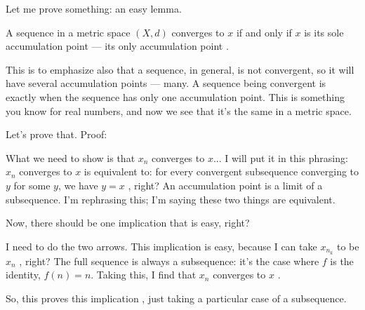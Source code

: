 \begin{speech}[00:29:05 - 00:30:50]
Let me prove something: an easy lemma.

A sequence in a metric space $(X, d)$  converges to $x$  if and only if  $x$ is its sole accumulation point --- its only accumulation point . 

This is to emphasize also that a sequence, in general, is not convergent, so it will have several accumulation points --- many. A sequence being convergent is exactly when the sequence has only one accumulation point. This is something you know for real numbers, and now we see that it's the same in a metric space.

Let's prove that. Proof: 
\end{speech}

\begin{content}
\end{content}

\begin{speech}[00:30:50 - 00:32:51]
What we need to show is that $x_n$ converges to $x$...  I will put it in this phrasing: $x_n$ converges to $x$ is equivalent to: for every convergent subsequence converging to $y$ for some $y$, we have $y = x$ , right? An accumulation point is a limit of a subsequence. I'm rephrasing this; I'm saying these two things are equivalent.

Now, there should be one implication that is easy, right? 

I need to do the two arrows. This implication is easy, because I can take $x_{n_k}$ to be $x_n$ , right? The full sequence is always a subsequence: it's the case where $f$ is the identity, $f(n) = n$. Taking this, I find that $x_n$ converges to $x$ .

So, this proves this implication , just taking a particular case of a subsequence.
\end{speech}

